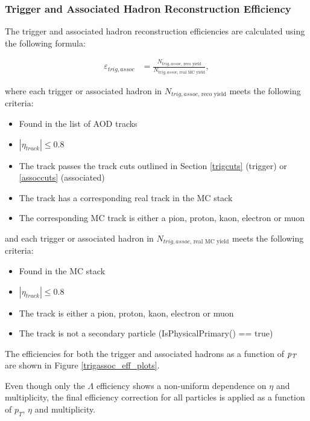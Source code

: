 \documentclass[ALICE,manyauthors]{ALICE_analysis_notes}
\begin{document}
\subsubsection{Trigger and Associated Hadron Reconstruction Efficiency}
\label{trigassoc_efficiency}

The trigger and associated hadron reconstruction efficiencies are calculated using the following formula:

\begin{align*}
	\varepsilon_{trig, assoc} &=  \frac{N_{trig, assoc\text{, reco yield}}}{N_{trig, assoc\text{, real MC yield}}},
\end{align*}

where each trigger or associated hadron in $N_{trig, assoc\text{, reco yield}}$ meets the following criteria:

\begin{itemize}
	\item Found in the list of AOD tracks
	\item $|\eta_{track}| \leq 0.8$
	\item The track passes the track cuts outlined in Section \ref{trigcuts} (trigger) or \ref{assoccuts} (associated)
	\item The track has a corresponding real track in the MC stack
	\item The corresponding MC track is either a pion, proton, kaon, electron or muon
\end{itemize}

and each trigger or associated hadron in $N_{trig, assoc\text{, real MC yield}}$ meets the following criteria:

\begin{itemize}
	\item Found in the MC stack
	\item $|\eta_{track}| \leq 0.8$
	\item The track is either a pion, proton, kaon, electron or muon
	\item The track is not a secondary particle (IsPhysicalPrimary() == true)
\end{itemize}

The efficiencies for both the trigger and associated hadrons as a function of $\it{p}_T$ are shown in Figure \ref{trigassoc_eff_plots}.

Even though only the $\Lambda$ efficiency shows a non-uniform dependence on $\eta$ and multiplicity, the final efficiency correction for all particles is applied as a function of $p_{T}$, $\eta$ and multiplicity.
\end{document}
